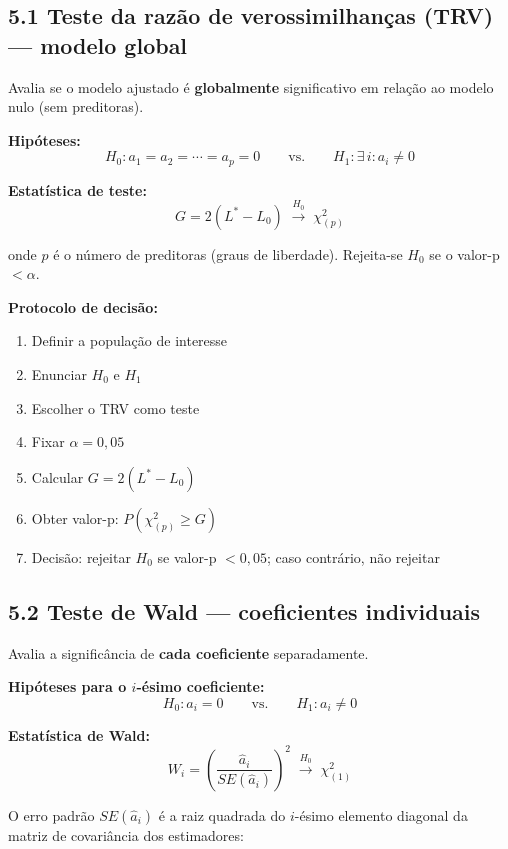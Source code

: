 \documentclass[
  letterpaper,
  DIV=11,
  numbers=noendperiod]{scrartcl}
\providecommand{\tightlist}{%
  \setlength{\itemsep}{0pt}\setlength{\parskip}{0pt}}
\begin{document}
\subsection{5.1 Teste da razão de verossimilhanças (TRV) --- modelo
global}\label{teste-da-razuxe3o-de-verossimilhanuxe7as-trv-modelo-global}

Avalia se o modelo ajustado é \textbf{globalmente} significativo em
relação ao modelo nulo (sem preditoras).

\textbf{Hipóteses:}
\[H_0: a_1 = a_2 = \cdots = a_p = 0 \qquad \text{vs.} \qquad H_1: \exists\, i: a_i \neq 0\]

\textbf{Estatística de teste:}
\[G = 2(L^* - L_0) \;\overset{H_0}{\longrightarrow}\; \chi^2_{(p)}\]

onde \(p\) é o número de preditoras (graus de liberdade). Rejeita-se
\(H_0\) se o valor-p \(< \alpha\).

\textbf{Protocolo de decisão:}

\begin{enumerate}
\def\labelenumi{\arabic{enumi}.}
\tightlist
\item
  Definir a população de interesse
\item
  Enunciar \(H_0\) e \(H_1\)
\item
  Escolher o TRV como teste
\item
  Fixar \(\alpha = 0{,}05\)
\item
  Calcular \(G = 2(L^* - L_0)\)
\item
  Obter valor-p: \(P(\chi^2_{(p)} \geq G)\)
\item
  Decisão: rejeitar \(H_0\) se valor-p \(< 0{,}05\); caso contrário, não
  rejeitar
\end{enumerate}

\subsection{5.2 Teste de Wald --- coeficientes
individuais}\label{teste-de-wald-coeficientes-individuais}

Avalia a significância de \textbf{cada coeficiente} separadamente.

\textbf{Hipóteses para o \(i\)-ésimo coeficiente:}
\[H_0: a_i = 0 \qquad \text{vs.} \qquad H_1: a_i \neq 0\]

\textbf{Estatística de Wald:}
\[W_i = \left(\frac{\hat{a}_i}{SE(\hat{a}_i)}\right)^2 \;\overset{H_0}{\longrightarrow}\; \chi^2_{(1)}\]

O erro padrão \(SE(\hat{a}_i)\) é a raiz quadrada do \(i\)-ésimo
elemento diagonal da matriz de covariância dos estimadores:
\end{document}
